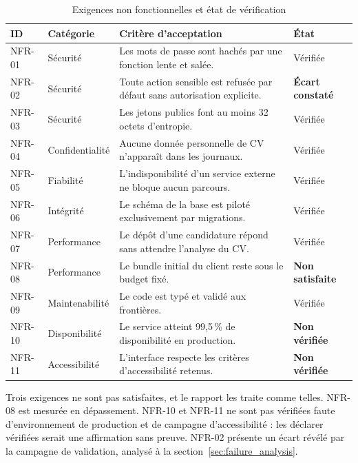\begin{table}[htbp]
  \centering
  \caption{Exigences non fonctionnelles et état de vérification}
  \label{tab:nfr}
  \begin{tabularx}{\textwidth}{L{1.9cm} L{2.5cm} X L{2.2cm}}
    \toprule
    \textbf{ID} & \textbf{Catégorie} & \textbf{Critère d'acceptation} & \textbf{État} \\
    \midrule
    NFR-01 & Sécurité      & Les mots de passe sont hachés par une fonction lente et salée. & Vérifiée \\
    NFR-02 & Sécurité      & Toute action sensible est refusée par défaut sans autorisation explicite. & \textbf{Écart constaté} \\
    NFR-03 & Sécurité      & Les jetons publics font au moins 32 octets d'entropie. & Vérifiée \\
    NFR-04 & Confidentialité & Aucune donnée personnelle de CV n'apparaît dans les journaux. & Vérifiée \\
    NFR-05 & Fiabilité     & L'indisponibilité d'un service externe ne bloque aucun parcours. & Vérifiée \\
    NFR-06 & Intégrité     & Le schéma de la base est piloté exclusivement par migrations. & Vérifiée \\
    NFR-07 & Performance   & Le dépôt d'une candidature répond sans attendre l'analyse du CV. & Vérifiée \\
    NFR-08 & Performance   & Le bundle initial du client reste sous le budget fixé. & \textbf{Non satisfaite} \\
    NFR-09 & Maintenabilité & Le code est typé et validé aux frontières. & Vérifiée \\
    NFR-10 & Disponibilité & Le service atteint 99,5\,\% de disponibilité en production. & \textbf{Non vérifiée} \\
    NFR-11 & Accessibilité & L'interface respecte les critères d'accessibilité retenus. & \textbf{Non vérifiée} \\
    \bottomrule
  \end{tabularx}
\end{table}

Trois exigences ne sont pas satisfaites, et le rapport les traite comme telles.
NFR-08 est mesurée en dépassement. NFR-10 et NFR-11 ne sont pas vérifiées faute
d'environnement de production et de campagne d'accessibilité : les déclarer
vérifiées serait une affirmation sans preuve. NFR-02 présente un écart révélé
par la campagne de validation, analysé à la
section~\ref{sec:failure_analysis}.

